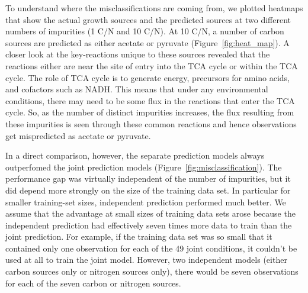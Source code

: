 \documentclass[12pt]{article}
\begin{document}
To understand where the misclassifications are coming from, we plotted heatmaps that show the actual growth sources and the predicted sources at two different numbers of impurities (1 C/N and 10 C/N). At 10 C/N, a number of carbon sources are predicted as either acetate or pyruvate (Figure~\ref{fig:heat_map}). A closer look at the key-reactions unique to these sources revealed that the reactions either are near the site of entry into the TCA cycle or within the TCA cycle. The role of TCA cycle is to generate energy, precursors for amino acids, and cofactors such as NADH.  This means that under any environmental conditions, there may need to be some flux in the reactions that enter the TCA cycle. So, as the number of distinct impurities increases, the flux resulting from these impurities is seen through these common reactions and hence observations get mispredicted as acetate or pyruvate. 

In a direct comparison, however, the separate prediction models always outperfomed the joint prediction models (Figure~\ref{fig:misclassification}). The performance gap was virtually independent of the number of impurities, but it did depend more strongly on the size of the training data set. In particular for smaller training-set sizes, independent prediction performed much better. We assume that the advantage at small sizes of training data sets arose because the independent prediction had effectively seven times more data to train than the joint prediction. For example, if the training data set was so small that it contained only one observation for each of the 49 joint conditions, it couldn't be used at all to train the joint model. However, two independent models (either carbon sources only or nitrogen sources only), there would be seven observations for each of the seven carbon or nitrogen sources.
\end{document}

